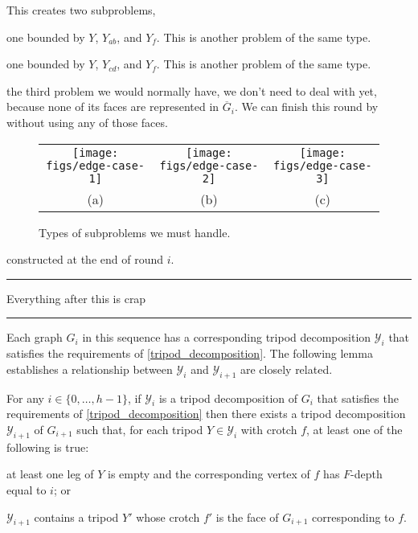 \documentclass{patmorin}
\begin{document}
\begin{compactenum}[(a)]
  This creates two subproblems,
  \begin{compactitem}
     \item one bounded by $Y$, $Y_{ab}$, and $Y_f$.  This is another problem of the same type.
     \item one bounded by $Y$, $Y_{cd}$, and $Y_f$.  This is another problem of the same type.
     \item the third problem we would normally have, we don't need to deal with yet, because none of its faces are represented in $\overline{G}_i$.  We can finish this round by without using any of those faces.
 \end{compactitem}
\end{compactenum}

\begin{figure}
  \begin{center}
    \begin{tabular}{ccc}
      \texttt{[image: figs/edge-case-1]} &
      \texttt{[image: figs/edge-case-2]} &
      \texttt{[image: figs/edge-case-3]} \\
      (a) & (b) & (c)
    \end{tabular}
  \end{center}
  \caption{Types of subproblems we must handle.}
  \label{cases}
\end{figure}
 constructed at the end of round $i$.








\noindent
\hrule
Everything after this is crap
\hrule









Each graph $G_i$ in this sequence has a corresponding tripod decomposition $\mathcal{Y}_i$ that satisfies the requirements of \cref{tripod_decomposition}.  The following lemma establishes a relationship between $\mathcal{Y}_i$ and $\mathcal{Y}_{i+1}$ are closely related.

\begin{lem}\label{next_step}
  For any $i\in\{0,\ldots,h-1\}$, if $\mathcal{Y}_i$ is a tripod decomposition of $G_i$ that satisfies the requirements of \cref{tripod_decomposition} then there exists a tripod decomposition $\mathcal{Y}_{i+1}$ of $G_{i+1}$ such that, for each tripod $Y\in \mathcal{Y}_i$ with crotch $f$, at least one of the following is true:
  \begin{compactenum}[(i)]
    \item at least one leg of $Y$ is empty and the corresponding vertex of $f$ has $F$-depth equal to $i$; or
    \item $\mathcal{Y}_{i+1}$ contains a tripod $Y'$ whose crotch $f'$ is the face of $G_{i+1}$ corresponding to $f$.
  \end{compactenum}
\end{lem}
\end{document}
